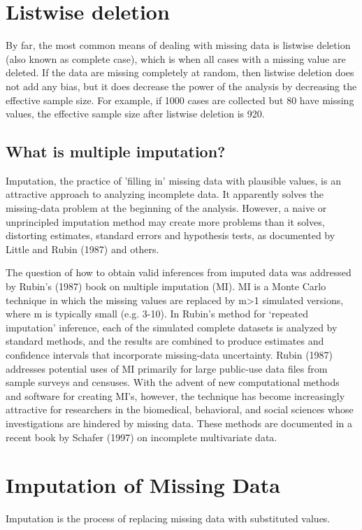 


\section{Listwise deletion}
By far, the most common means of dealing with missing data is listwise deletion (also known as complete case), which is when all cases with a missing value are deleted. If the data are missing completely at random, then listwise deletion does not add any bias, but it does decrease the power of the analysis by decreasing the effective sample size. For example, if 1000 cases are collected but 80 have missing values, the effective sample size after listwise deletion is 920. 
\subsection{What is multiple imputation?}

Imputation, the practice of 'filling in' missing data with plausible values, is an attractive approach to analyzing incomplete data. It apparently solves the missing-data problem at the beginning of the analysis. However, a naive or unprincipled imputation method may create more problems than it solves, distorting estimates, standard errors and hypothesis tests, as documented by Little and Rubin (1987) and others.

The question of how to obtain valid inferences from imputed data was addressed by Rubin's (1987) book on multiple imputation (MI). MI is a Monte Carlo technique in which the missing values are replaced by m>1 simulated versions, where m is typically small (e.g. 3-10). 
In Rubin's method for `repeated imputation' inference, each of the simulated complete datasets is analyzed by standard methods, and the results are combined to produce estimates and confidence intervals that incorporate missing-data uncertainty. Rubin (1987) addresses potential uses of MI primarily for large public-use data files from sample surveys and censuses. With the advent of new computational methods and software for creating MI's, however, the technique has become increasingly attractive for researchers in the biomedical, behavioral, and social sciences whose investigations are hindered by missing data. These methods are documented in a recent book by Schafer (1997) on incomplete multivariate data.
\section{Imputation of Missing Data}
Imputation is the process of replacing missing data with substituted values.
